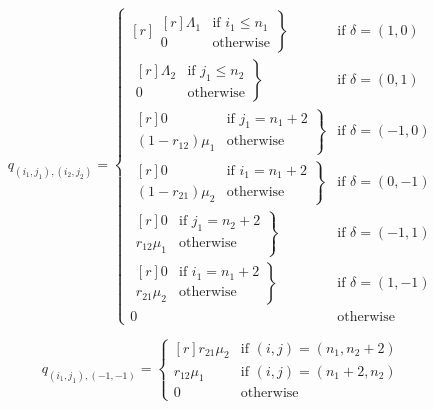 \documentclass{article}
\begin{document}
\begin{equation}
  q_{(i_1, j_1),(i_2, j_2)} = \left\{
  \begin{matrix*}[ r ]
    \left. \begin{matrix*}[ r ]
      \Lambda_1 & \text{if } i_1 \leq n_1 \\
      0 & \text{otherwise}
    \end{matrix*} \right\} & \text{if } \delta = (1, 0) \\
    \left. \begin{matrix*}[ r ]
      \Lambda_2 & \text{if } j_1 \leq n_2 \\
      0 & \text{otherwise}
    \end{matrix*} \right\} & \text{if } \delta = (0, 1) \\
    \left. \begin{matrix*}[ r ]
      0 & \text{if } j_1 = n_1 + 2 \\
      (1 - r_{12})\mu_1 & \text{otherwise}
    \end{matrix*} \right\} & \text{if } \delta = (-1, 0) \\
    \left. \begin{matrix*}[ r ]
      0 & \text{if } i_1 = n_1 + 2 \\
      (1 - r_{21})\mu_2 & \text{otherwise}
    \end{matrix*} \right\} & \text{if } \delta = (0, -1) \\
    \left. \begin{matrix*}[ r ]
      0 & \text{if } j_1 = n_2 + 2 \\
      r_{12}\mu_1 & \text{otherwise}
    \end{matrix*} \right\} & \text{if } \delta = (-1, 1) \\
    \left. \begin{matrix*}[ r ]
      0 & \text{if } i_1 = n_1 + 2 \\
      r_{21}\mu_2 & \text{otherwise}
    \end{matrix*} \right\} & \text{if } \delta = (1, -1) \\
    0 & \text{otherwise}
  \end{matrix*} \right.
\end{equation}

\begin{equation}
  q_{(i_1, j_1), (-1, -1)} = \left\{
  \begin{matrix*}[ r ]
    r_{21}\mu_2 & \text{if } (i, j) = (n_1, n_2 + 2) \\
    r_{12}\mu_1 & \text{if } (i, j) = (n_1 + 2, n_2) \\
    0 & \text{otherwise}
  \end{matrix*}
  \right.
\end{equation}
\end{document}
